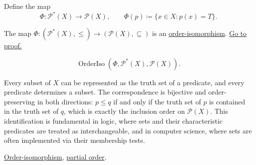Define the map
\[
\Phi : \mathcal{P}^*(X) \to \mathcal{P}(X),
\qquad
\Phi(p) \coloneqq \{x \in X : p(x) = T\}.
\]

\begin{proposition}
\label{prop:predicates-power-sets-iso}
The map $\Phi : (\mathcal{P}^*(X), \leq) \to (\mathcal{P}(X), \subseteq)$
is an \hyperref[def:order-isomorphism]{order-isomorphism}.
\hyperref[prf:predicates-power-sets-iso]{Go to proof.}
\end{proposition}

\begin{remark*}
\[
\operatorname{OrderIso}(\Phi, \mathcal{P}^*(X), \mathcal{P}(X)).
\]
\end{remark*}

\begin{remark*}[Interpretation]
Every subset of $X$ can be represented as the truth set of a predicate,
and every predicate determines a subset.  The correspondence is bijective
and order-preserving in both directions: $p \leq q$ if and only if the
truth set of $p$ is contained in the truth set of $q$, which is exactly
the inclusion order on $\mathcal{P}(X)$.  This identification is
fundamental in logic, where sets and their characteristic predicates are
treated as interchangeable, and in computer science, where sets are
often implemented via their membership tests.
\end{remark*}

\begin{remark*}[Dependencies]
\hyperref[def:order-isomorphism]{Order-isomorphism},
\hyperref[def:lattice-order-partial-order]{partial order}.
\end{remark*}
